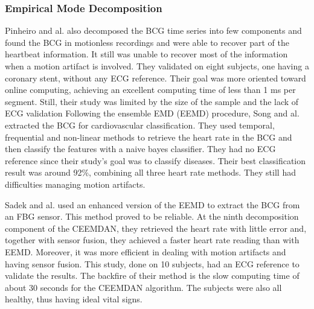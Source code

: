 \documentclass[twoside,onecolumn]{article}
\begin{document}
\subsubsection{Empirical Mode Decomposition}
Pinheiro and al. \cite{pinheiro_online_2010} also decomposed the BCG time series into few components and found the BCG in motionless recordings and were able to recover part of the heartbeat information. It still was unable to recover most of the information when a motion artifact is involved. They validated on eight subjects, one having a coronary stent, without any ECG reference. Their goal was more oriented toward online computing, achieving an excellent computing time of less than 1 ms per segment. Still, their study was limited by the size of the sample and the lack of ECG validation
Following the ensemble EMD (EEMD) procedure, Song and al. \cite{song_extracting_2015} extracted the BCG for cardiovascular classification. They used temporal, frequential and non-linear methods to retrieve the heart rate in the BCG and then classify the features with a naive bayes classifier. They had no ECG reference since their study's goal was to classify diseases. Their best classification result was around 92\%, combining all three heart rate methods. They still had difficulties managing motion artifacts.

Sadek and al. \cite{sadek_automatic_2015} used an enhanced version of the EEMD to extract the BCG from an FBG sensor. This method proved to be reliable. At the ninth decomposition component of the CEEMDAN, they retrieved the heart rate with little error and, together with sensor fusion, they achieved a faster heart rate reading than with EEMD. Moreover, it was more efficient in dealing with motion artifacts and having sensor fusion. This study, done on 10 subjects, had an ECG reference to validate the results. The backfire of their method is the slow computing time of about 30 seconds for the CEEMDAN algorithm. The subjects were also all healthy, thus having ideal vital signs.
\end{document}
